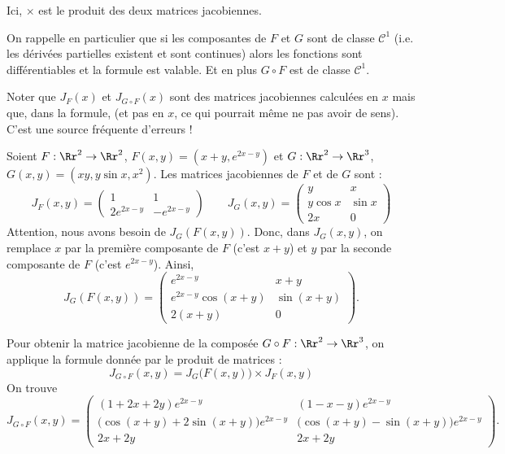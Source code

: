 \documentclass[11pt, class=report,crop=false]{standalone}
\begin{document}
Ici, \og{}$\times$\fg{} est le produit des deux matrices jacobiennes.


On rappelle en particulier que si les composantes de $F$ et $G$ sont de classe $\mathcal{C}^1$ (i.e. les dérivées partielles existent et sont continues) alors les fonctions sont différentiables et la formule est valable. Et en plus $G \circ F$ est de classe $\mathcal{C}^1$.

\bigskip

 Noter que $J_F(x)$ et $J_{G \circ F} (x)$ sont des matrices jacobiennes calculées en $x$ mais que, dans la formule,  (et pas en $x$, ce qui pourrait même ne pas avoir de sens). C'est une source fréquente d'erreurs !

\begin{exemple}
Soient $F : \Rr^2 \to \Rr^2$, $F(x,y) = (x + y, e^{2x-y})$ et 
$G : \Rr^2 \to \Rr^3$, $G(x,y) = (xy, y\sin x, x^2)$.
Les matrices jacobiennes de $F$ et de $G$ sont :
$$J_F(x,y) = 
\begin{pmatrix}
1&1 \\ 2e^{2x-y} &-e^{2x-y}
\end{pmatrix}
\qquad
J_G(x,y) = 
\begin{pmatrix}
y & x \\ y \cos x & \sin x \\ 2x & 0
\end{pmatrix}$$
Attention, nous avons besoin de $J_G (F(x,y))$. Donc, dans $J_G(x,y)$, on remplace $x$ par la première composante de $F$ (c'est $x+y$) et $y$ par la seconde composante de $F$ (c'est $e^{2x-y}$). Ainsi,
$$J_G( F(x,y) ) = 
\begin{pmatrix}
e^{2x-y} & x+y \\ e^{2x-y} \cos(x+y) & \sin(x+y) \\ 2(x+y) & 0
\end{pmatrix}.$$


Pour obtenir la matrice jacobienne de la composée $G \circ F : \Rr^2 \to \Rr^3$, on applique la formule donnée par le produit de matrices :
$$J_{G \circ F} (x,y) = J_G \big( F(x,y) \big) \times J_F (x,y)$$
On trouve
$$J_{G \circ F} (x,y) 
= 
\begin{pmatrix}
(1+2x+2y)e^{2x-y} & (1-x-y)e^{2x-y} \\
\big( \cos(x+y) + 2\sin(x+y) \big)e^{2x-y} & \big( \cos(x+y) - \sin(x+y) \big)e^{2x-y}\\
2x+2y & 2x+2y
\end{pmatrix}.$$
\end{exemple}
\end{document}

